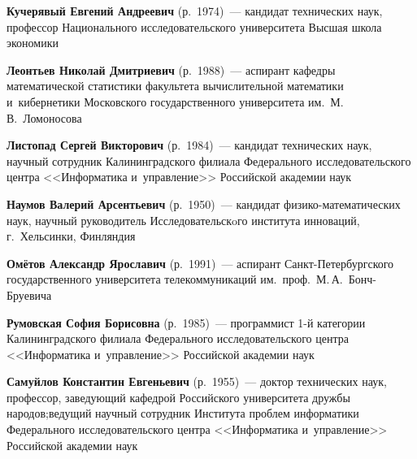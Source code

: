 \begin{multicols}{2}
\vspace*{3pt}

\noindent
\textbf{Кучерявый Евгений Андреевич} (р.\ 1974)~---
кандидат технических наук,  профессор Национального исследовательского 
университета Высшая школа экономики

\vspace*{3pt}

\noindent
\textbf{Леонтьев Николай Дмитриевич} (р.\ 1988)~--- 
аспирант кафедры 
математической статистики факультета вычислительной математики и~кибернетики 
Московского государственного университета им.\ М.\,В.~Ломоносова

\vspace*{3pt}


\noindent
\textbf{Листопад Сергей Викторович} (р.\ 1984)~---
кандидат технических наук, научный сотрудник 
Калининградского филиала Федерального исследовательского центра 
<<Информатика и~управ\-ле\-ние>> Российской академии наук

\pagebreak

\noindent
\textbf{Наумов Валерий Арсентьевич} (р.\ 1950)~---
кандидат фи\-зи\-ко-ма\-те\-ма\-ти\-че\-ских наук, 
научный руководитель  Исследовательскoго института инноваций, г.~Хельсинки, Финляндия 

\vspace*{3pt}

\noindent
\textbf{Омётов Александр Ярославич} (р.\ 1991)~---
аспирант Санкт-Пе\-тер\-бург\-ско\-го государственного университета телекоммуникаций 
им.\ проф.\ М.\,А.~Бонч-Бру\-евича

\vspace*{3pt}

\noindent
\textbf{Румовская София Борисовна} (р.\ 1985)~---
программист 1-й категории Калининградского филиала Федерального исследовательского центра 
<<Информатика и~управ\-ле\-ние>> Российской академии наук

\vspace*{3pt}

\noindent
\textbf{Самуйлов Константин Евгеньевич} (р.\ 1955)~---
доктор технических наук, профессор, заведующий кафед\-рой Российского 
университета дружбы народов;\linebreak веду\-щий научный сотрудник Института проб\-лем 
информатики Федерального исследовательского центра <<Информатика и~управ\-ле\-ние>> 
Российской академии наук

\vspace*{3pt}


\end{multicols}
